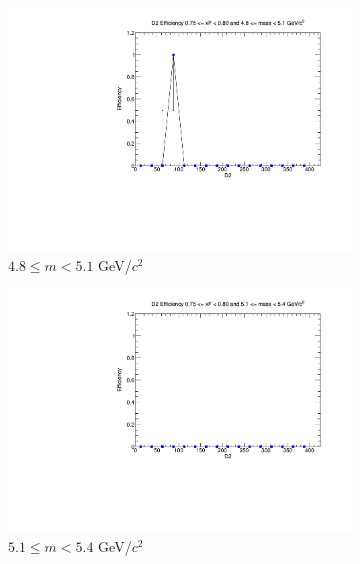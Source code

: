\begin{figure}[p]
\begin{subfigure}[b]{0.32\textwidth}
        \centering
        \includegraphics[width=\textwidth]{./kTrackerEfficiencyPlots/D2_Efficiency_xF15_mass2.pdf}
        \caption{$4.8 \leq m < 5.1$ GeV/$c^2$}
        \label{fig:xF15_mass2}
    \end{subfigure}
    \vspace{0.5cm}
    \begin{subfigure}[b]{0.32\textwidth}
        \centering
        \includegraphics[width=\textwidth]{./kTrackerEfficiencyPlots/D2_Efficiency_xF15_mass3.pdf}
        \caption{$5.1 \leq m < 5.4$ GeV/$c^2$}
        \label{fig:xF15_mass3}
    \end{subfigure}
    \hfill
    \begin{subfigure}[b]{0.32\textwidth}
        \centering

\end{subfigure}
\end{figure}
